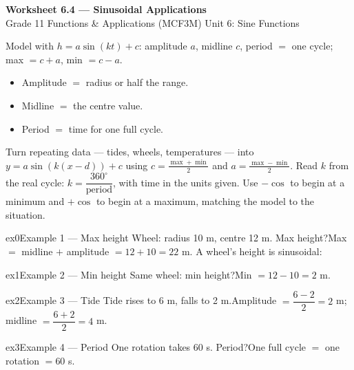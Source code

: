 \documentclass[11pt]{article}
\begin{document}
\begin{center}
{\LARGE\bfseries\color{titleblue}Worksheet 6.4 --- Sinusoidal Applications}\\[2pt]
{\small Grade 11 Functions \& Applications (MCF3M) \textperiodcentered{} Unit 6: Sine Functions}
\end{center}

\begin{ideabox}
Model with $h=a\sin(kt)+c$: amplitude $a$, midline $c$, period $=$ one cycle; max $=c+a$, min $=c-a$.
\begin{itemize}[leftmargin=*,itemsep=2pt]
  \item Amplitude $=$ radius or half the range.
  \item Midline $=$ the centre value.
  \item Period $=$ time for one full cycle.
\end{itemize}
\end{ideabox}

\begin{learnbox}
Turn repeating data — tides, wheels, temperatures — into $y=a\sin\!\left(k(x-d)\right)+c$ using $c=\tfrac{\max+\min}{2}$ and $a=\tfrac{\max-\min}{2}$.
Read $k$ from the real cycle: $k=\dfrac{360^\circ}{\text{period}}$, with time in the units given.
Use $-\cos$ to begin at a minimum and $+\cos$ to begin at a maximum, matching the model to the situation.
\end{learnbox}


\begin{example}{ex0}{Example 1 --- Max height}
Wheel: radius 10 m, centre 12 m. Max height?\soln Max $=$ midline $+$ amplitude $=12+10=22$ m. A wheel's height is sinusoidal:
\end{example}

\begin{example}{ex1}{Example 2 --- Min height}
Same wheel: min height?\soln Min $=12-10=2$ m.
\end{example}

\begin{example}{ex2}{Example 3 --- Tide}
Tide rises to 6 m, falls to 2 m.\soln Amplitude $=\dfrac{6-2}{2}=2$ m; midline $=\dfrac{6+2}{2}=4$ m.
\end{example}

\begin{example}{ex3}{Example 4 --- Period}
One rotation takes 60 s. Period?\soln One full cycle $=$ one rotation $=60$ s.
\end{example}
\end{document}
